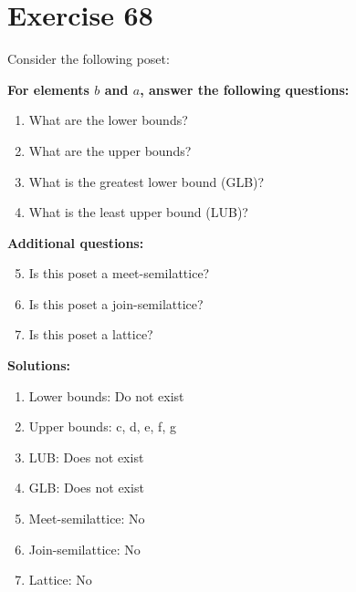 \documentclass{article}
\begin{document}
\section*{Exercise 68}
Consider the following poset:
\begin{center}
\end{center}

    \textbf{For elements $b$ and $a$, answer the following questions:}
\begin{enumerate}
    \item What are the lower bounds?
    \item What are the upper bounds?
    \item What is the greatest lower bound (GLB)?
    \item What is the least upper bound (LUB)?
\end{enumerate}
    \hspace*{3ex} \textbf{Additional questions:}
\begin{enumerate}
    \setcounter{enumi}{4}
    \item Is this poset a meet-semilattice?
    \item Is this poset a join-semilattice?
    \item Is this poset a lattice?
\end{enumerate}

\textbf{Solutions:}
\begin{enumerate}
    \item Lower bounds: Do not exist
    \item Upper bounds: {c, d, e, f, g}
    \item LUB: Does not exist
    \item GLB: Does not exist
    \item Meet-semilattice: No
    \item Join-semilattice: No
    \item Lattice: No
\end{enumerate}
\newpage
\end{document}
